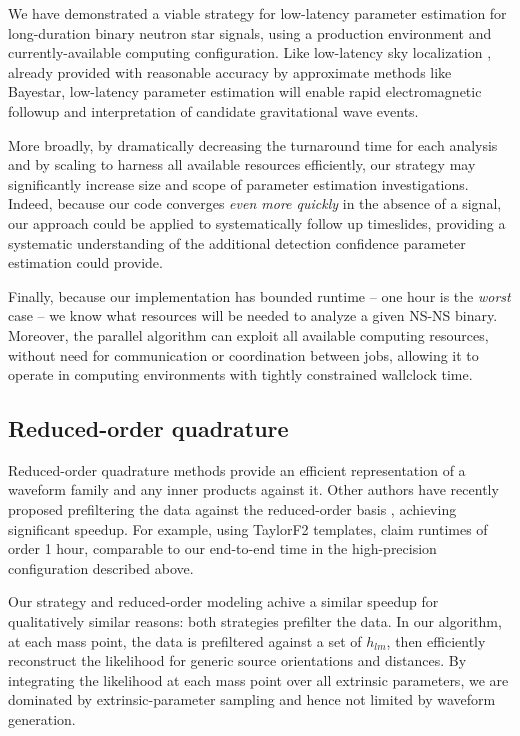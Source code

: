 \documentclass[twocolumn,prd,nofootinbib]{revtex4}
\newcommand\BS{{\sc Bayestar}}
\begin{document}
We have demonstrated a viable strategy for low-latency parameter estimation for long-duration binary neutron star signals, using
a production environment and currently-available computing configuration.   
%
Like low-latency sky localization 
\cite{gwastro-skyloc-Sidery2013,LIGO-2013-WhitePaper-CoordinatedEMObserving}, already provided with reasonable accuracy
by approximate methods like \BS{}, low-latency parameter estimation will enable rapid electromagnetic followup and interpretation of
candidate gravitational wave events. 


%
More broadly, by dramatically decreasing the turnaround time for each analysis and by scaling to harness all available
resources efficiently, our strategy may significantly increase size and scope of parameter estimation investigations.
%
Indeed, because our code converges \emph{even more quickly} in the absence of a signal, our approach could be applied to
systematically follow up timeslides, providing a systematic understanding of the additional detection confidence
parameter estimation could provide. 
%


Finally, because our implementation has bounded runtime -- one hour is the \emph{worst} case -- we know what  resources
will be needed to analyze a given NS-NS binary. Moreover, the parallel algorithm can exploit all available computing
resources, without need for communication or coordination between jobs, allowing it to operate in computing environments
with tightly constrained wallclock time. 


\subsection{Reduced-order quadrature}
Reduced-order quadrature methods provide an efficient representation of a waveform family and any inner products against
it.   Other authors have recently proposed prefiltering the data against the reduced-order basis
\cite{gw-astro-ReducedOrderQuadraturePE-TiglioEtAl2014}, achieving significant speedup.  For example, using TaylorF2
templates, \cite{gw-astro-ReducedOrderQuadraturePE-TiglioEtAl2014} claim runtimes of order 1 hour, comparable to our
end-to-end time in the high-precision configuration described above.

Our strategy and reduced-order modeling achive a similar speedup for qualitatively similar reasons: both strategies
prefilter the data.   In our algorithm, at each mass point, the data is prefiltered  against a
set of $h_{lm}$, then efficiently reconstruct the likelihood for generic source orientations and distances.  
%
By integrating the likelihood at each mass point over all extrinsic parameters,  we are dominated by extrinsic-parameter
sampling and  hence not limited by waveform generation.
\end{document}
